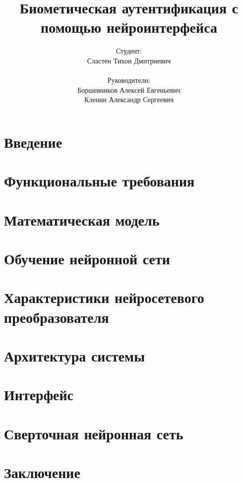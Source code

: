 \documentclass{beamer}
\title{Биометическая аутентификация с помощью нейроинтерфейса}
\author{
    Студент: \\ Сластен Тихон Дмитриевич \\ \\
    Руководители: \\ Боршевников Алексей Евгеньевич \\ Кленин Александр Сергеевич}
\institute{Б8303а Прикладная математика и информатика}
\date{}
\begin{document}
\maketitle

\section{Введение}





\section{Функциональные требования}



\section{Математическая модель}





\section{Обучение нейронной сети}



\section{Характеристики нейросетевого преобразователя}


\section{Архитектура системы}



\section{Интерфейс}



\section{Сверточная нейронная сеть}




\section{Заключение}

% 
\end{document}
